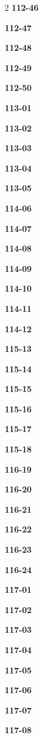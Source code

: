 \documentclass[10pt,a4paper]{article}
\begin{document}
\begin{multicols}{2}
\noindent\textbf{112-46}\ \par
\noindent\textbf{112-47}\ \par
\noindent\textbf{112-48}\ \par
\noindent\textbf{112-49}\ \par
\noindent\textbf{112-50}\ \par
\noindent\textbf{113-01}\ \par
\noindent\textbf{113-02}\ \par
\noindent\textbf{113-03}\ \par
\noindent\textbf{113-04}\ \par
\noindent\textbf{113-05}\ \par
\noindent\textbf{114-06}\ \par
\noindent\textbf{114-07}\ \par
\noindent\textbf{114-08}\ \par
\noindent\textbf{114-09}\ \par
\noindent\textbf{114-10}\ \par
\noindent\textbf{114-11}\ \par
\noindent\textbf{114-12}\ \par
\noindent\textbf{115-13}\ \par
\noindent\textbf{115-14}\ \par
\noindent\textbf{115-15}\ \par
\noindent\textbf{115-16}\ \par
\noindent\textbf{115-17}\ \par
\noindent\textbf{115-18}\ \par
\noindent\textbf{116-19}\ \par
\noindent\textbf{116-20}\ \par
\noindent\textbf{116-21}\ \par
\noindent\textbf{116-22}\ \par
\noindent\textbf{116-23}\ \par
\noindent\textbf{116-24}\ \par
\noindent\textbf{117-01}\ \par
\noindent\textbf{117-02}\ \par
\noindent\textbf{117-03}\ \par
\noindent\textbf{117-04}\ \par
\noindent\textbf{117-05}\ \par
\noindent\textbf{117-06}\ \par
\noindent\textbf{117-07}\ \par
\noindent\textbf{117-08}\ \par

\end{multicols}
\end{document}
